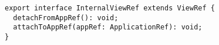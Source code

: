 \begin{verbatim}
export interface InternalViewRef extends ViewRef {
  detachFromAppRef(): void;
  attachToAppRef(appRef: ApplicationRef): void;
}
\end{verbatim}

